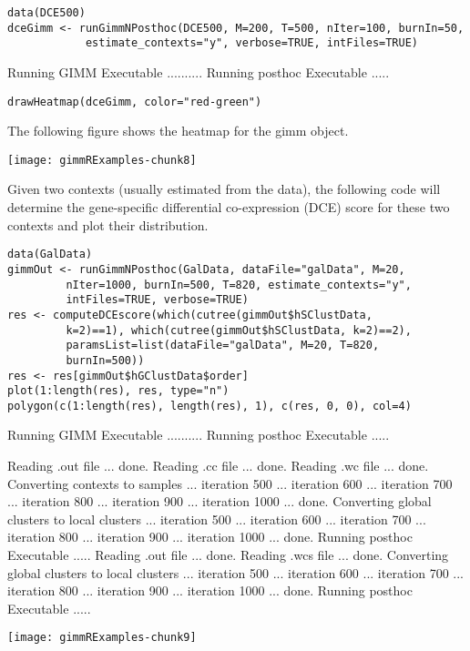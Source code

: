 \documentclass[12pt]{article}
\begin{document}
\begin{verbatim}
data(DCE500)
dceGimm <- runGimmNPosthoc(DCE500, M=200, T=500, nIter=100, burnIn=50,
            estimate_contexts="y", verbose=TRUE, intFiles=TRUE)
\end{verbatim}

\begin{Schunk}
\begin{Soutput}
Running GIMM Executable ..........
Running posthoc Executable ..... 
\end{Soutput}
\end{Schunk}
\begin{verbatim}
drawHeatmap(dceGimm, color="red-green")
\end{verbatim}

The following figure shows the heatmap for the gimm object.\newline

\texttt{[image: gimmRExamples-chunk8]}

Given two contexts (usually estimated from the data), the following code will determine the
gene-specific differential co-expression (DCE) score for these two contexts and plot their
distribution.

\begin{verbatim}
data(GalData)
gimmOut <- runGimmNPosthoc(GalData, dataFile="galData", M=20, 
         nIter=1000, burnIn=500, T=820, estimate_contexts="y", 
		 intFiles=TRUE, verbose=TRUE)
res <- computeDCEscore(which(cutree(gimmOut$hSClustData,
         k=2)==1), which(cutree(gimmOut$hSClustData, k=2)==2),
         paramsList=list(dataFile="galData", M=20, T=820,
         burnIn=500))
res <- res[gimmOut$hGClustData$order]
plot(1:length(res), res, type="n")
polygon(c(1:length(res), length(res), 1), c(res, 0, 0), col=4)
\end{verbatim}
\begin{Schunk}
\begin{Soutput}
Running GIMM Executable ..........
Running posthoc Executable ..... 
\end{Soutput}
\begin{Soutput}
Reading .out file ... done.
Reading .cc file ... done.
Reading .wc file ... done.
Converting contexts to samples ... 
   iteration  500  ... 
   iteration  600  ... 
   iteration  700  ... 
   iteration  800  ... 
   iteration  900  ... 
   iteration  1000  ... done.
Converting global clusters to local clusters ... 
   iteration  500  ... 
   iteration  600  ... 
   iteration  700  ... 
   iteration  800  ... 
   iteration  900  ... 
   iteration  1000  ... done.
Running posthoc Executable ..... 
Reading .out file ... done.
Reading .wcs file ... done.
Converting global clusters to local clusters ... 
   iteration  500  ... 
   iteration  600  ... 
   iteration  700  ... 
   iteration  800  ... 
   iteration  900  ... 
   iteration  1000  ... done.
Running posthoc Executable ..... 
\end{Soutput}
\end{Schunk}
\texttt{[image: gimmRExamples-chunk9]}
\end{document}
